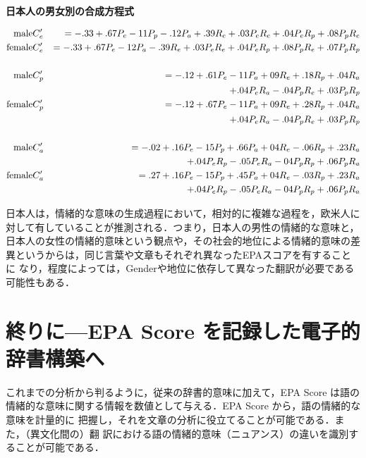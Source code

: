\documentclass[japanese]{jnlp_1.3d}
\begin{document}
\vspace{\baselineskip}
\begin{center}
 {\bf 日本人の男女別の合成方程式}
\end{center}
\begin{small}
\begin{eqnarray*}
\mbox{male} &C'_e& = -.33 + .67P_e -11P_p-.12P_a +.39R_e + .03P_e
 R_e  +.04P_e R_p+.08P_p R_e \\  
\mbox{female}&C'_e& = -.33 + .67P_e -12P_a-.39R_e + .03P_e  R_e
 +.04P_e R_p+.08P_p R_e + .07P_p R_p\\  
\\
\mbox{male} &C'_p& = -.12 + .61P_e -11P_a + 09R_e +.18R_p  +.04R_a  \\ 
 & &  \hspace{53mm}  + .04P_e
 R_a  -.04P_p R_e +.03P_p R_p \\  
\mbox{female} &C'_p& = -.12 + .67P_e -11P_a + 09R_e +.28R_p  +.04R_a \\
 & & \hspace{53mm} + .04P_e  R_a  -.04P_p R_e +.03P_p R_p \\  
\\
\mbox{male} &C'_a& = -.02 + .16P_e -15P_p + .66P_a + 04R_e -.06R_p
 +.23R_a   \\
 & & \hspace{43mm}+ .04P_e  R_p-.05P_e R_a -04P_p R_p +.06 P_p R_a \\  
\mbox{female} &C'_a& = .27 + .16P_e -15P_p + .45P_a + 04R_e -.03R_p
 +.23R_a   \\
 & & \hspace{43mm}+ .04P_e  R_p -.05P_e R_a -04P_p R_p +.06 P_p R_a \\  
\end{eqnarray*}
\end{small}
日本人は，情緒的な意味の生成過程において，相対的に複雑な過程を，欧米人に
対して有していることが推測される．つまり，日本人の男性の情緒的な意味と，
日本人の女性の情緒的意味という観点や，その社会的地位による情緒的意味の差
異というからは，同じ言葉や文章もそれぞれ異なったEPAスコアを有することに
なり，程度によっては，Genderや地位に依存して異なった翻訳が必要である可能性もある．



\section*{終りに—EPA Score を記録した電子的辞書構築へ}
これまでの分析から判るように，従来の辞書的意味に加えて，EPA Score は語の情緒的な意味に関する情報を数値として与える．EPA Score から，語の情緒的な意味を計量的に
把握し，それを文章の分析に役立てることが可能である．また，（異文化間の）翻
訳における語の情緒的意味（ニュアンス）の違いを識別することが可能である．
\end{document}
